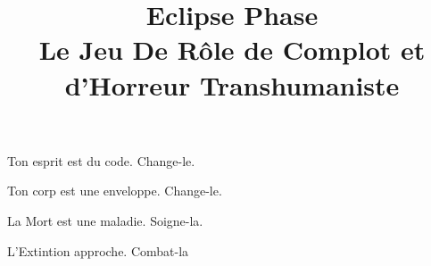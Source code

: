 \documentclass{book}
\begin{document}
 

\title{Eclipse Phase\\ Le Jeu De Rôle de Complot et d'Horreur Transhumaniste} \date{} 

\maketitle



\begin{frontmatter} 

\begin{center} Ton esprit est du code. Change-le. 

Ton corp est une enveloppe. Change-le. 

La Mort est une maladie. Soigne-la. 

L'Extintion approche. Combat-la \end{center} 

\newpage



 

\tableofcontents



\end{frontmatter} 

\begin{mainmatter} 

              

\end{mainmatter} 
\end{document}
